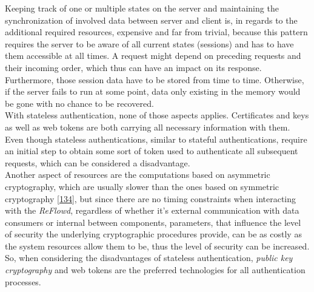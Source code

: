 \documentclass[12pt,english,a4paper,titlepage,cleardoublepage=empty,dottedtoc]{report}
\begin{document}
Keeping track of one or multiple states on the server and maintaining
the synchronization of involved data between server and client is, in
regards to the additional required resources, expensive and far from
trivial, because this pattern requires the server to be aware of all
current states (sessions) and has to have them accessible at all times.
A request might depend on preceding requests and their incoming order,
which thus can have an impact on its response. Furthermore, those
session data have to be stored from time to time. Otherwise, if the
server fails to run at some point, data only existing in the memory
would be gone with no chance to be recovered.\\
With stateless authentication, none of those aspects applies.
Certificates and keys as well as web tokens are both carrying all
necessary information with them. Even though stateless authentications,
similar to stateful authentications, require an initial step to obtain
some sort of token used to authenticate all subsequent requests, which
can be considered a disadvantage.\\
Another aspect of resources are the computations based on asymmetric
cryptography, which are usually slower than the ones based on symmetric
cryptography
{[}\protect\hyperlink{ref-book_2014_chapter-10-5-asym-random-number-gen}{134}{]},
but since there are no timing constraints when interacting with the
\emph{ReFlowd}, regardless of whether it's external communication with
data consumers or internal between components, parameters, that
influence the level of security the underlying cryptographic procedures
provide, can be as costly as the system resources allow them to be, thus
the level of security can be increased.\\
So, when considering the disadvantages of stateless authentication,
\emph{public key cryptography} and web tokens are the preferred
technologies for all authentication processes.
\end{document}
